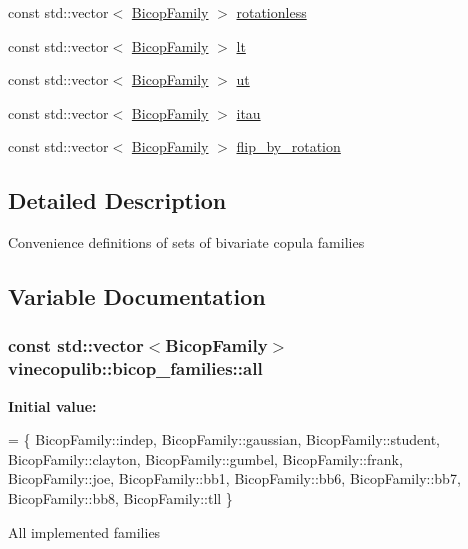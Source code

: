\begin{DoxyCompactItemize}
\item 
const std\+::vector$<$ \hyperlink{namespacevinecopulib_a42e95cc06d33896199caab0c11ad44f3}{Bicop\+Family} $>$ \hyperlink{namespacevinecopulib_1_1bicop__families_ac221bc84c32d2836692ed40d89439928}{rotationless}
\item 
const std\+::vector$<$ \hyperlink{namespacevinecopulib_a42e95cc06d33896199caab0c11ad44f3}{Bicop\+Family} $>$ \hyperlink{namespacevinecopulib_1_1bicop__families_a5a5f349f07638768ff8b1bb2ae90d102}{lt}
\item 
const std\+::vector$<$ \hyperlink{namespacevinecopulib_a42e95cc06d33896199caab0c11ad44f3}{Bicop\+Family} $>$ \hyperlink{namespacevinecopulib_1_1bicop__families_af754a2d2697709c204dda0473215f9cd}{ut}
\item 
const std\+::vector$<$ \hyperlink{namespacevinecopulib_a42e95cc06d33896199caab0c11ad44f3}{Bicop\+Family} $>$ \hyperlink{namespacevinecopulib_1_1bicop__families_af92a2e71f03e2280276533def655760d}{itau}
\item 
const std\+::vector$<$ \hyperlink{namespacevinecopulib_a42e95cc06d33896199caab0c11ad44f3}{Bicop\+Family} $>$ \hyperlink{namespacevinecopulib_1_1bicop__families_ae1ae1673e3d4a9c57bd9df074e17a3b9}{flip\+\_\+by\+\_\+rotation}
\end{DoxyCompactItemize}


\subsection{Detailed Description}
Convenience definitions of sets of bivariate copula families 

\subsection{Variable Documentation}
\subsubsection[{\texorpdfstring{all}{all}}]{\setlength{\rightskip}{0pt plus 5cm}const std\+::vector$<${\bf Bicop\+Family}$>$ vinecopulib\+::bicop\+\_\+families\+::all}\hypertarget{namespacevinecopulib_1_1bicop__families_a5214a513f41ec23b74782aab96ea6774}{}\label{namespacevinecopulib_1_1bicop__families_a5214a513f41ec23b74782aab96ea6774}
{\bfseries Initial value\+:}
\begin{DoxyCode}
= \{
    BicopFamily::indep,
    BicopFamily::gaussian,
    BicopFamily::student,
    BicopFamily::clayton,
    BicopFamily::gumbel,
    BicopFamily::frank,
    BicopFamily::joe,
    BicopFamily::bb1,
    BicopFamily::bb6,
    BicopFamily::bb7,
    BicopFamily::bb8,
    BicopFamily::tll
\}
\end{DoxyCode}
All implemented families 
